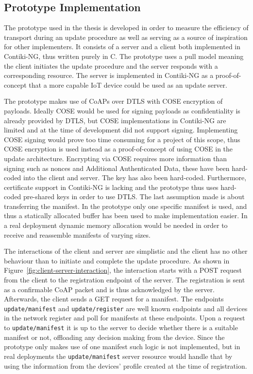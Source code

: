 \documentclass[0-thesis.tex]{subfiles}
\begin{document}
\subsection{Prototype Implementation}
\label{ssec:prototype-implementation}
The prototype used in the thesis is developed in order to measure the efficiency of
transport during an update procedure as well as serving as a source of inspiration for
other implementers. It consists of a server and a client both implemented in Contiki-NG,
thus written purely in C. The prototype uses a pull model meaning the client initiates the
update procedure and the server responds with a corresponding resource. The server is
implemented in Contiki-NG as a proof-of-concept that a more capable IoT device could be
used as an update server.

The prototype makes use of CoAPs over DTLS with COSE encryption of payloads. Ideally COSE
would be used for signing payloads as confidentiality is already provided by DTLS, but
COSE implementations in Contiki-NG are limited and at the time of development did not
support signing. Implementing COSE signing would prove too time consuming for a project of
this scope, thus COSE encryption is used instead as a proof-of-concept of using COSE in
the update architecture. Encrypting via COSE requires more information than signing such
as nonces and Additional Authenticated Data, these have been hard-coded into the client
and server. The key has also been hard-coded. Furthermore, certificate support in
Contiki-NG is lacking and the prototype thus uses hard-coded pre-shared keys in order to
use DTLS. The last assumption made is about transferring the manifest. In the prototype
only one specific manifest is used, and thus a statically allocated buffer has been used
to make implementation easier. In a real deployment dynamic memory allocation would be
needed in order to receive and reassemble manifests of varying sizes.

The interactions of the client and server are simplistic and the client has no other
behaviour than to initiate and complete the update procedure. As shown in
Figure~\ref{fig:client-server-interaction}, the interaction starts with a POST request
from the client to the registration endpoint of the server. The registration is sent as a
confirmable CoAP packet and is thus acknowledged by the server. Afterwards, the client
sends a GET request for a manifest. The endpoints \texttt{update/manifest} and
\texttt{update/register} are well known endpoints and all devices in the network register
and poll for manifests at these endpoints. Upon a request to \texttt{update/manifest} it
is up to the server to decide whether there is a suitable manifest or not, offloading any
decision making from the device. Since the prototype only makes use of one manifest such
logic is not implemented, but in real deployments the \texttt{update/manifest} server
resource would handle that by using the information from the devices' profile created at
the time of registration.
\end{document}
